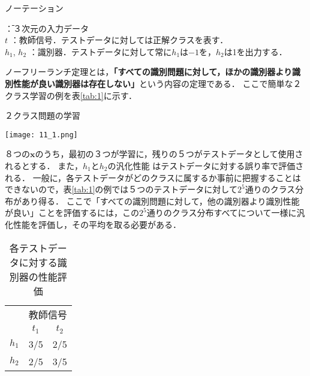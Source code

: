 \documentclass[dvipdfmx]{jreport}
\begin{document}
\begin{itembox}[l]{\large{ノーテーション}}
        \begin{tabbing}
            \hspace{15pt} \raisebox{0.5ex}{\tiny $\bullet$}  \hspace{17pt} \= ：３次元の入力データ \\[0.5em]
            \hspace{15pt} \raisebox{0.5ex}{\tiny $\bullet$} $t$      \> ：教師信号．テストデータに対しては正解クラスを表す．\\[0.5em]
            \hspace{15pt} \raisebox{0.5ex}{\tiny $\bullet$} $h_1$, $h_2$ \> ：識別器．テストデータに対して常に$h_1$は$-1$を，$h_2$は1を出力する．
        \end{tabbing}
\end{itembox}

ノーフリーランチ定理とは，\textbf{「すべての識別問題に対して，ほかの識別器より識別性能が良い識別器は存在しない」}という内容の定理である．
ここで簡単な２クラス学習の例を表\ref{tab:1}に示す．

\begin{table}[h]
    \begin{center}
        \caption{２クラス問題の学習}\label{tab:1}
        \texttt{[image: 11\_1.png]}
    \end{center}
\end{table}

８つの$\bm{x}$のうち，最初の３つが学習に，残りの５つがテストデータとして使用されるとする．
また，$h_1$と$h_2$の汎化性能
はテストデータに対する誤り率で評価される．
一般に，各テストデータがどのクラスに属するか事前に把握することはできないので，表\ref{tab:1}の例では５つのテストデータに対して$2^5$通りのクラス分布があり得る．
ここで「すべての識別問題に対して，他の識別器より識別性能が良い」ことを評価するには，この$2^5$通りのクラス分布すべてについて一様に汎化性能を評価し，その平均を取る必要がある．

\begin{table}[h]
    \begin{center}
        \caption{各テストデータに対する識別器の性能評価}\label{tab:2}
        \begin{tabular}{|l||c|c|} \hline
            & \multicolumn{2}{|c|}{教師信号} \\ \cline{2-3}
            & $t_1$ & $t_2$ \\ \hline
            $h_1$ & 3/5 & 2/5 \\
            $h_2$ & 2/5 & 3/5 \\ \hline
        \end{tabular}
    \end{center}
\end{table}
\end{document}
